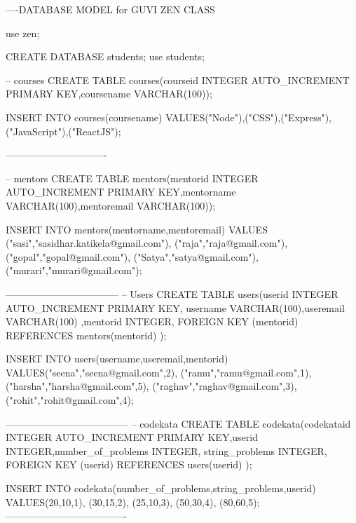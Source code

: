 ----DATABASE MODEL for GUVI ZEN CLASS




use zen;



CREATE DATABASE students;
use students;

-- courses
CREATE TABLE courses(courseid INTEGER AUTO_INCREMENT PRIMARY KEY,coursename VARCHAR(100));

INSERT INTO courses(coursename) VALUES("Node"),("CSS"),("Express"),("JavaScript"),("ReactJS");

-------------------------------

-- mentors
CREATE TABLE mentors(mentorid INTEGER AUTO_INCREMENT PRIMARY KEY,mentorname VARCHAR(100),mentoremail VARCHAR(100));


INSERT INTO mentors(mentorname,mentoremail) VALUES ("sasi","sasidhar.katikela@gmail.com"),
                                                   ("raja","raja@gmail.com"),
                                                   ("gopal","gopal@gmail.com"),
                                                   ("Satya","satya@gmail.com"),
                                                   ("murari","murari@gmail.com");

-----------------------------------
-- Users
CREATE TABLE users(userid INTEGER AUTO_INCREMENT PRIMARY KEY, username VARCHAR(100),useremail VARCHAR(100)
,mentorid INTEGER, 
FOREIGN KEY (mentorid) REFERENCES mentors(mentorid)
);

INSERT INTO users(username,useremail,mentorid) VALUES("seena","seena@gmail.com",2),
                                                    ("ramu","ramu@gmail.com",1),
                                                    ("harsha","harsha@gmail.com",5),
                                                    ("raghav","raghav@gmail.com",3),
                                                    ("rohit","rohit@gmail.com",4);


--------------------------------------
-- codekata
CREATE TABLE codekata(codekataid INTEGER AUTO_INCREMENT PRIMARY KEY,userid INTEGER,number_of_problems INTEGER,
 string_problems INTEGER,
 FOREIGN KEY (userid) REFERENCES users(userid)
 );
 
 INSERT INTO codekata(number_of_problems,string_problems,userid) VALUES(20,10,1),
                                                                       (30,15,2),
                                                                       (25,10,3),
                                                                       (50,30,4),
                                                                       (80,60,5);
-------------------------------------
 

